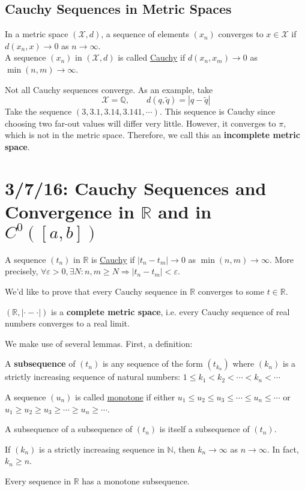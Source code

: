 \documentclass[12pt]{article}
\begin{document}
\subsection{Cauchy Sequences in Metric Spaces}
In a metric space $(\mathscr{X},d)$, a sequence of elements $(x_n)$ converges to $x \in \mathscr{X}$ if $d(x_n,x) \to 0$ as $n \to \infty$. \\

A sequence $(x_n)$ in $(\mathscr{X},d)$ is called \underline{Cauchy} if $d(x_n,x_m) \to 0$ as $\min(n,m) \to \infty$.

Not all Cauchy sequences converge. As an example, take \[ \mathscr{X} = \mathbb{Q}, \qquad d(q,\tilde{q}) = |q- \tilde{q}| \]
Take the sequence $(3,3.1,3.14,3.141,\cdots)$. This sequence is Cauchy since choosing two far-out values will differ very little. However, it converges to $\pi$, which is not in the metric space. Therefore, we call this an \textbf{incomplete metric space}.


\section{3/7/16: Cauchy Sequences and Convergence in $\mathbb{R}$ and in $C^0([a,b])$}

A sequence $(t_n)$ in $\mathbb{R}$ is \underline{Cauchy} if $|t_n - t_m| \to 0$ as $\min(n,m) \to \infty$. More precisely, $\forall \varepsilon > 0, \exists N: n,m \ge N \Rightarrow |t_n - t_m| < \varepsilon$.

We'd like to prove that every Cauchy sequence in $\mathbb{R}$ converges to some $t \in \mathbb{R}$.

\begin{theorem}
$(\mathbb{R}, |\cdot - \cdot |)$ is a \textbf{complete metric space}, i.e. every Cauchy sequence of real numbers converges to a real limit.
\end{theorem}

We make use of several lemmas. First, a definition:
\begin{definition}
A \textbf{subsequence} of $(t_n)$ is any sequence of the form $(t_{k_n})$ where $(k_n)$ is a strictly increasing sequence of natural numbers: $1 \le k_1 < k_2 < \cdots < k_n < \cdots$
\end{definition}
\begin{definition}
A sequence $(u_n)$ is called \underline{monotone} if either $u_1 \le u_2 \le u_3 \le \cdots \le u_n \le \cdots$ or $u_1 \ge u_2 \ge u_3 \ge \cdots \ge u_n \ge \cdots$.
\end{definition}
\begin{lemma}
A subsequence of a subsequence of $(t_n)$ is itself a subsequence of $(t_n)$.
\end{lemma}
\begin{lemma}
If $(k_n)$ is a strictly increasing sequence in $\mathbb{N}$, then $k_n \to \infty$ as $n \to \infty$. In fact, $k_n \ge n$.
\end{lemma}
\begin{lemma}
Every sequence in $\mathbb{R}$ has a monotone subsequence.
\end{lemma}
\end{document}
